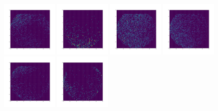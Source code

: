 \documentclass[12pt,prd]{article}
\begin{document}
\begin{figure}[h!]
\includegraphics[width=0.24\textwidth]{../figures/stars_near_zero_2dhistgaiascan_l101_2_b58_4_ra212_7_dec55_2_npy_9.pdf}
\includegraphics[width=0.24\textwidth]{../figures/stars_near_zero_2dhistgaiascan_l101_2_b58_4_ra212_7_dec55_2_npy_10.pdf}
\includegraphics[width=0.24\textwidth]{../figures/stars_near_zero_2dhistgaiascan_l101_2_b58_4_ra212_7_dec55_2_npy_11.pdf}
\includegraphics[width=0.24\textwidth]{../figures/stars_near_zero_2dhistgaiascan_l101_2_b58_4_ra212_7_dec55_2_npy_12.pdf}
\includegraphics[width=0.24\textwidth]{../figures/stars_near_zero_2dhistgaiascan_l101_2_b58_4_ra212_7_dec55_2_npy_13.pdf}
\includegraphics[width=0.24\textwidth]{../figures/stars_near_zero_2dhistgaiascan_l101_2_b58_4_ra212_7_dec55_2_npy_14.pdf}

\end{figure}
\end{document}
